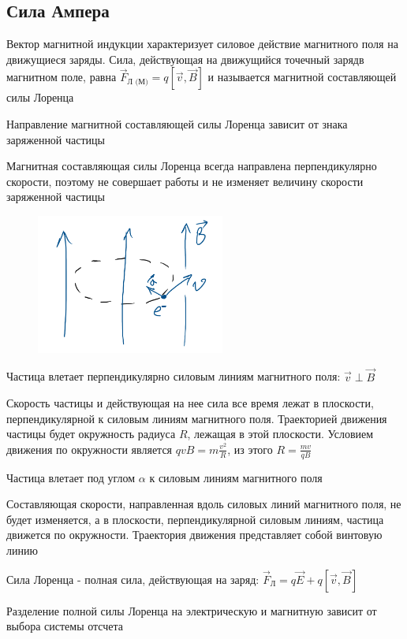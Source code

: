 \documentclass[12pt]{article}
\begin{document}
\subsection{Сила Ампера}

Вектор магнитной индукции характеризует силовое действие магнитного поля на движущиеся заряды. 
Сила, действующая на движущийся точечный зарядв магнитном поле, равна $\vec{F}_{\text{Л (М)}} = q [\vec{v}, \vec{B}]$
и называется магнитной составляющей силы Лоренца

Направление магнитной составляющей силы Лоренца зависит от знака заряженной частицы

Магнитная составляющая силы Лоренца всегда направлена перпендикулярно скорости, поэтому не совершает работы и не изменяет величину скорости заряженной частицы

\begin{figure}
    \includegraphics[width=6.2cm]{physics2/images/physics2_2025_02_24_1}
\end{figure}

\Ex Частица влетает перпендикулярно силовым линиям магнитного поля: $\vec{v} \perp \vec{B}$

Скорость частицы и действующая на нее сила все время лежат в плоскости, перпендикулярной к силовым линиям магнитного поля. 
Траекторией движения частицы будет окружность радиуса $R$, лежащая в этой плоскости. 
Условием движения по окружности является $q v B = m\frac{v^2}{R}$, из этого $R = \frac{mv}{qB}$


\Ex Частица влетает под углом $\alpha$ к силовым линиям магнитного поля

Составляющая скорости, направленная вдоль силовых линий магнитного поля, не будет изменяется, 
а в плоскости, перпендикулярной силовым линиям, частица движется по окружности. Траектория движения 
представляет собой винтовую линию

\Mem Сила Лоренца - полная сила, действующая на заряд: $\vec{F}_\text{Л} = q\vec{E} + q[\vec{v}, \vec{B}]$

Разделение полной силы Лоренца на электрическую и магнитную зависит от выбора системы отсчета
\end{document}
